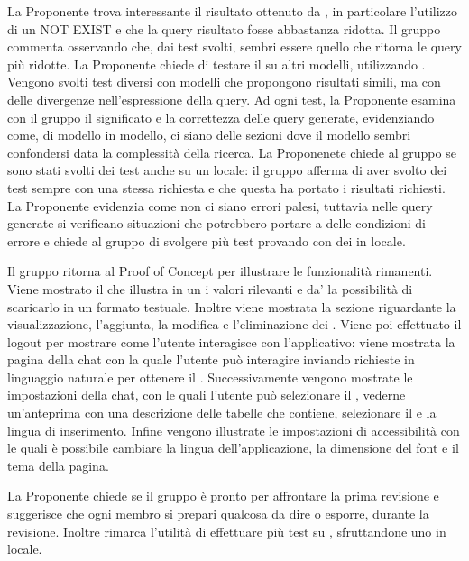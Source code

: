 \par La Proponente trova interessante il risultato ottenuto da , in particolare l'utilizzo di un NOT EXIST e che la query risultato fosse abbastanza ridotta. Il gruppo commenta osservando che, dai test svolti,  sembri essere quello che ritorna le query più ridotte.
La Proponente chiede di testare il  su altri modelli, utilizzando . Vengono svolti test diversi con modelli che propongono risultati simili, ma con delle divergenze nell'espressione della query. Ad ogni test, la Proponente esamina con il gruppo il significato e la correttezza delle query generate, evidenziando come, di modello in modello, ci siano delle sezioni dove il modello sembri confondersi data la complessità della ricerca.
La Proponenete chiede al gruppo se sono stati svolti dei test anche su un  locale: il gruppo afferma di aver svolto dei test sempre con una stessa richiesta e che questa ha portato i risultati richiesti.
La Proponente evidenzia come non ci siano errori palesi, tuttavia nelle query generate si verificano situazioni che potrebbero portare a delle condizioni di errore e chiede al gruppo di svolgere più test provando con dei  in locale.

\par Il gruppo ritorna al Proof of Concept per illustrare le funzionalità rimanenti. Viene mostrato il  che illustra in un  i valori rilevanti e da' la possibilità di scaricarlo in un formato testuale. Inoltre viene mostrata la sezione riguardante la visualizzazione, l'aggiunta, la modifica e l'eliminazione dei .
Viene poi effettuato il logout per mostrare come l'utente interagisce con l'applicativo: viene mostrata la pagina della chat con la quale l'utente può interagire inviando richieste in linguaggio naturale per ottenere il . Successivamente vengono mostrate le impostazioni della chat, con le quali l'utente può selezionare il , vederne un'anteprima con una descrizione delle tabelle che contiene, selezionare il  e la lingua di inserimento.
Infine vengono illustrate le impostazioni di accessibilità con le quali è possibile cambiare la lingua dell'applicazione, la dimensione del font e il tema della pagina.

\par La Proponente chiede se il gruppo è pronto per affrontare la prima revisione e suggerisce che ogni membro si prepari qualcosa da dire o esporre, durante la revisione. Inoltre rimarca l'utilità di effettuare più test su , sfruttandone uno in locale.

